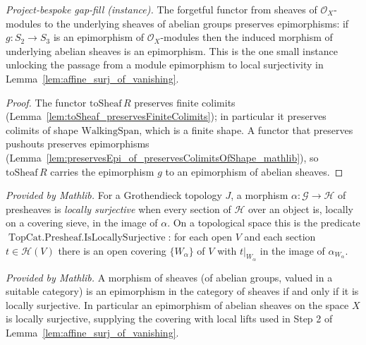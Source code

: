 \begin{lemma}
  \label{lem:to_sheaf_preserves_epi}
  \leanok
  \textit{Project-bespoke gap-fill (instance).}
  The forgetful functor from sheaves of \(\mathcal{O}_X\)-modules to the underlying sheaves of
  abelian groups preserves epimorphisms: if \(g : S_2 \to S_3\) is an epimorphism of
  \(\mathcal{O}_X\)-modules then the induced morphism of underlying abelian sheaves is an
  epimorphism. This is the one small instance unlocking the passage from a module epimorphism to
  local surjectivity in Lemma~\ref{lem:affine_surj_of_vanishing}.
\end{lemma}
\begin{proof}
  \leanok
  The functor \(\mathrm{toSheaf}\,R\) preserves finite colimits
  (Lemma~\ref{lem:toSheaf_preservesFiniteColimits}); in particular it preserves colimits of shape
  \(\mathrm{WalkingSpan}\), which is a finite shape. A functor that preserves pushouts preserves
  epimorphisms (Lemma~\ref{lem:preservesEpi_of_preservesColimitsOfShape_mathlib}), so
  \(\mathrm{toSheaf}\,R\) carries the epimorphism \(g\) to an epimorphism of abelian sheaves.
\end{proof}

\begin{lemma}
  \label{lem:presheaf_is_locally_surjective}
  \mathlibok
  \textit{Provided by Mathlib.}
  For a Grothendieck topology \(J\), a morphism \(\alpha : \mathcal{G} \to \mathcal{H}\) of presheaves
  is \emph{locally surjective} when every section of \(\mathcal{H}\) over an object is, locally on a
  covering sieve, in the image of \(\alpha\). On a topological space this is the predicate
  \(\operatorname{TopCat.Presheaf.IsLocallySurjective}\): for each open \(V\) and each section
  \(t \in \mathcal{H}(V)\) there is an open covering \(\{W_\alpha\}\) of \(V\) with \(t|_{W_\alpha}\)
  in the image of \(\alpha_{W_\alpha}\).
\end{lemma}

\begin{lemma}
  \label{lem:sheaf_locally_surjective_iff_epi}
  \mathlibok
  \textit{Provided by Mathlib.}
  A morphism of sheaves (of abelian groups, valued in a suitable category) is an epimorphism in the
  category of sheaves if and only if it is locally surjective. In particular an epimorphism of
  abelian sheaves on the space \(X\) is locally surjective, supplying the covering with local lifts
  used in Step 2 of Lemma~\ref{lem:affine_surj_of_vanishing}.
\end{lemma}

